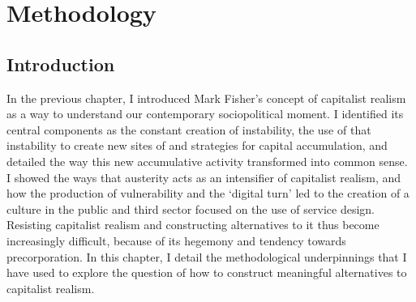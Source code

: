 \chapter{Methodology}
\label{3}

\section{Introduction}
\label{3-intro}



In the previous chapter, I introduced Mark Fisher’s concept of capitalist realism as a way to understand our contemporary sociopolitical moment. I identified its central components as the constant creation of instability, the use of that instability to create new sites of and strategies for capital accumulation, and detailed the way this new accumulative activity transformed into common sense. I showed the ways that austerity acts as an intensifier of capitalist realism, and how the production of vulnerability and the ‘digital turn’ led to the creation of a culture in the public and third sector focused on the use of service design. Resisting capitalist realism and constructing alternatives to it thus become increasingly difficult, because of its hegemony and tendency towards precorporation. In this chapter, I detail the methodological underpinnings that I have used to explore the question of how to construct meaningful alternatives to capitalist realism. 

